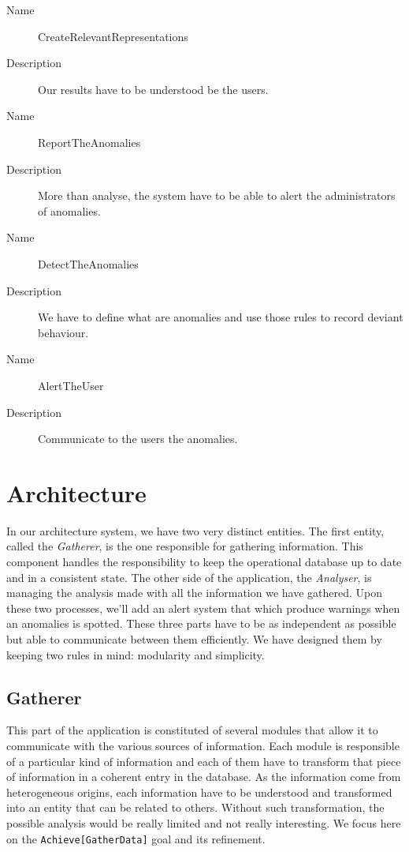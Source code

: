 \begin{description}
  \item[Name] CreateRelevantRepresentations
  \item[Description] Our results have to be understood be the users.
\end{description}

\begin{description}
  \item[Name] ReportTheAnomalies
  \item[Description] More than analyse, the system have to be able to alert the administrators of anomalies.
\end{description}

\begin{description}
  \item[Name] DetectTheAnomalies
  \item[Description] We have to define what are anomalies and use those rules to record deviant behaviour.
\end{description}

\begin{description}
  \item[Name] AlertTheUser
  \item[Description] Communicate to the users the anomalies.
\end{description}

\section{Architecture}
In our architecture system, we have two very distinct entities. The first entity, called the \textit{Gatherer}, is the one responsible for gathering information. This component handles the responsibility to keep the operational database up to date and in a consistent state. The other side of the application, the \textit{Analyser}, is managing the analysis made with all the information we have gathered. Upon these two processes, we'll add an alert system that which produce warnings when an anomalies is spotted. These three parts have to be as independent as possible but able to communicate between them efficiently. We have designed them by keeping two rules in mind: modularity and simplicity.

\subsection{Gatherer}
This part of the application is constituted of several modules that allow it to communicate with the various sources of information. Each module is responsible of a particular kind of information and each of them have to transform that piece of information in a coherent entry in the database. As the information come from heterogeneous origins, each information have to be understood and transformed into an entity that can be related to others. Without such transformation, the possible analysis would be really limited and not really interesting. We focus here on the \texttt{Achieve[GatherData]} goal and its refinement.

